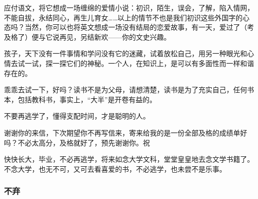 \par 应付语文，将它想成一场缠绵的爱情小说：初识，陌生，误会，了解，陷入情网，不能自拔，永结同心，再生儿育女……以上的情节不也是我们初识这些外国字的心态吗？当然，你可以也将英文想成一场没有结局的恋爱故事，有一天，爱过了（考及格了）便与它说再见，另结新欢——你的文史兴趣。
\par 孩子，天下没有一件事情和学问没有它的迷藏，试着放松自己，用另一种眼光和心情去试一试，探一探它们的神秘。一个人，在知识上，是可以有多面性而一样和谐存在的。
\par 乖乖去试一下，好吗？读书不是为父母，请想清楚，读书是为了充实自己，任何书本，包括教科书，事实上，“大半”是开卷有益的。
\par 不要再逃学了，懂得支配时间，才是聪明的人。
\par 谢谢你的来信，下次期望你不再写信来，寄来给我的是一份全部及格的成绩单好吗？不必太高分，及格就好了，预先谢谢你。祝
\par 快快长大，毕业，不必再逃学，将来如念大学文科，堂堂皇皇地去念文学书籍了。不念大学，也无不可，又可去看喜爱的书，不必逃学，也未尝不是乐事。
\par {}


\subsubsection{不弃}


